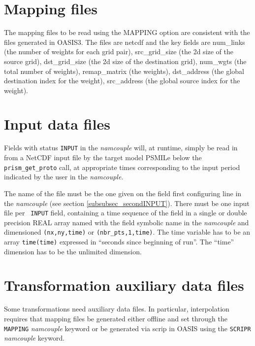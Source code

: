 \section{Mapping files}
\label{subsec_mapdata}

The mapping files to be read using the MAPPING option are consistent
with the files generated in OASIS3.  The files are netcdf and the
key fields are num\_links (the number of weights for each grid pair), src\_grid\_size
(the 2d size of the source grid), dst\_grid\_size
(the 2d size of the destination grid), num\_wgts (the
total number of weights), remap\_matrix (the weights), dst\_address
(the global destination index for the weight), src\_address (the global
source index for the weight).

\section{Input data files}
\label{subsec_inputdata}

Fields with status {\tt INPUT} in the {\it namcouple} will, at
  runtime, simply be read in from a NetCDF input file by the target
  model PSMILe below the {\tt prism\_get\_proto} call, at appropriate
  times corresponding to the input period indicated by the user in the
  {\it namcouple}. 

The name of the file must be the one given on the field first
configuring line in the {\it namcouple} (see section
\ref{subsubsec_secondINPUT}). There must be one input file per {\tt
INPUT} field, containing a time sequence of the field in a single or
double precision REAL array
named with the field symbolic name in the {\it namcouple} and
dimensioned {\tt (nx,ny,time)} or {\tt (nbr\_pts,1,time)}.  The time
variable has to be an array {\tt time(time)} expressed in
``seconds since beginning of run''. The ``time'' dimension has to
be the unlimited dimension. 


\section{Transformation auxiliary data files}
\label{subsec_transformationdata}

Some transformations need auxiliary data files.  In particular, interpolation
requires that mapping files be generated either offline and set through
the {\tt MAPPING} {\it namcouple} keyword or be generated via scrip in OASIS
using the {\tt SCRIPR} {\it namcouple} keyword.

